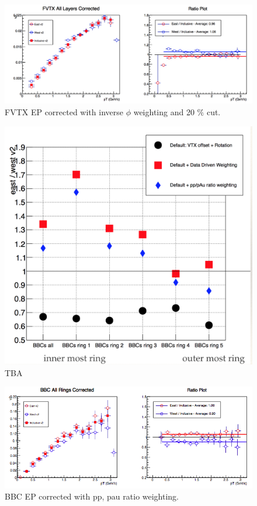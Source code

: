 \begin{figure}[!h]
\begin{center}
\includegraphics[width=0.5\linewidth]{figs/fvtx_corrected.png}
\caption{FVTX EP corrected with inverse $\phi$ weighting and 20 $\%$ cut.}
\end{center}
\end{figure}
\begin{figure}[!h]
\begin{center}
\includegraphics[width=0.5\linewidth]{figs/bbc_correction_summary.png}
\caption{TBA}
\end{center}
\end{figure}
\begin{figure}[!h]
\begin{center}
\includegraphics[width=0.5\linewidth]{figs/bbc_pp_correction.png}
\caption{BBC EP corrected with pp, pau ratio weighting.}
\end{center}
\end{figure}
